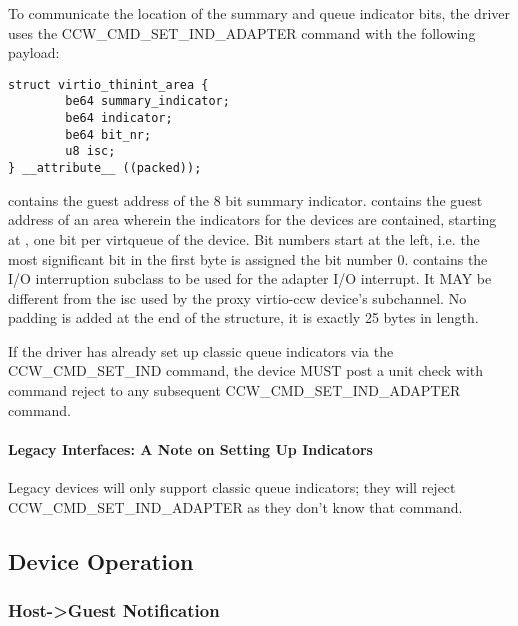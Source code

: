 To communicate the location of the summary and queue indicator bits,
the driver uses the CCW_CMD_SET_IND_ADAPTER command with the following
payload:

\begin{lstlisting}
struct virtio_thinint_area {
        be64 summary_indicator;
        be64 indicator;
        be64 bit_nr;
        u8 isc;
} __attribute__ ((packed));
\end{lstlisting}

 contains the guest address of the 8 bit summary
indicator.
 contains the guest address of an area wherein the indicators
for the devices are contained, starting at , one bit per
virtqueue of the device. Bit numbers start at the left, i.e. the most
significant bit in the first byte is assigned the bit number 0.
 contains the I/O interruption subclass to be used for the adapter
I/O interrupt. It MAY be different from the isc used by the proxy
virtio-ccw device's subchannel.
No padding is added at the end of the structure, it is exactly 25 bytes
in length.


If the driver has already set up classic queue indicators via the
CCW_CMD_SET_IND command, the device MUST post a unit check with
command reject to any subsequent CCW_CMD_SET_IND_ADAPTER command.

\paragraph{Legacy Interfaces: A Note on Setting Up Indicators}\label{sec:Virtio Transport Options / Virtio over channel I/O / Device Initialization / Setting Up Indicators / Legacy Interfaces: A Note on Setting Up Indicators}

Legacy devices will only support classic queue indicators; they will
reject CCW_CMD_SET_IND_ADAPTER as they don't know that command.

\subsection{Device Operation}\label{sec:Virtio Transport Options / Virtio over channel I/O / Device Operation}

\subsubsection{Host->Guest Notification}\label{sec:Virtio Transport Options / Virtio over channel I/O / Device Operation / Host->Guest Notification}

